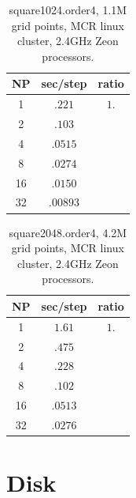 \documentclass[11pt]{article}
\begin{document}
\begin{table}[hbt]
\begin{center}\footnotesize
\begin{tabular}{|c|c|c|} \hline 
     NP       & sec/step   & ratio      \\   \hline\hline 
     1        &  $.221$    & $ 1. $     \\ 
     2        &  $.103$    & $    $     \\ 
     4        &  $.0515$    & $    $     \\
     8        &  $.0274$    & $    $     \\
    16        &  $.0150$   & $    $     \\
    32        &  $.00893$    & $    $     \\ \hline 
\end{tabular}		
\end{center}		
\caption{square1024.order4, 1.1M grid points, MCR linux cluster, 2.4GHz Zeon processors.}
 \label{tab:box} 
\end{table}



\begin{table}[hbt]
\begin{center}\footnotesize
\begin{tabular}{|c|c|c|} \hline 
     NP       & sec/step   & ratio      \\   \hline\hline 
     1        &  $1.61$    & $ 1. $     \\ 
     2        &  $.475$    & $    $     \\ 
     4        &  $.228$    & $    $     \\
     8        &  $.102$    & $    $     \\
    16        &  $.0513$   & $    $     \\
    32        &  $.0276$    & $    $     \\ \hline 
\end{tabular}		
\end{center}		
\caption{square2048.order4, 4.2M grid points, MCR linux cluster, 2.4GHz Zeon processors.}
 \label{tab:box} 
\end{table}


\clearpage
\section{Disk}
\end{document}
